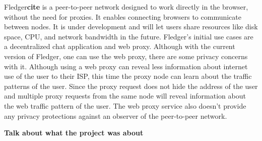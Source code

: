 \documentclass[a4paper,11pt,oneside]{report}
\begin{document}
Fledger\textbf{cite} is a peer-to-peer network designed to work directly in the browser, without the need for proxies. It enables connecting browsers to communicate between nodes. It is under development and will let users share resources like disk space, CPU, and network bandwidth in the future. Fledger's initial use cases are a decentralized chat application and web proxy. Although with the current version of Fledger, one can use the web proxy, there are some privacy concerns with it. Although using a web proxy can reveal less information about internet use of the user to their ISP, this time the proxy node can learn about the traffic patterns of the user. Since the proxy request does not hide the address of the user and multiple proxy requests from the same node will reveal information about the web traffic pattern of the user. The web proxy service also doesn't provide any privacy protections against an observer of the peer-to-peer network.

\textbf{Talk about what the project was about}





\end{document}
